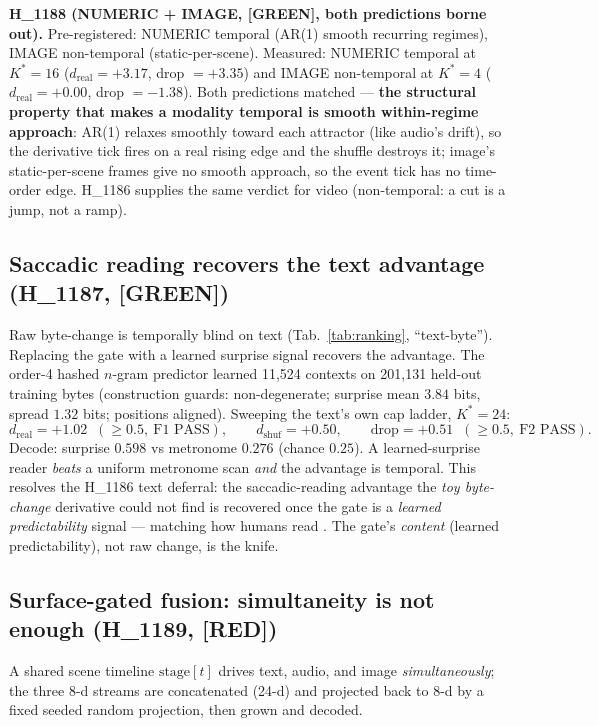 \documentclass[11pt,a4paper]{article}
\providecommand{\tierGreen}{\textbf{[GREEN]}}
\providecommand{\tierRed}{\textbf{[RED]}}
\newcommand{\dreal}{d_{\mathrm{real}}}
\newcommand{\dshuf}{d_{\mathrm{shuf}}}
\newcommand{\Kstar}{K^{\!*}}
\begin{document}
\noindent\textbf{H\_1188 (NUMERIC + IMAGE, \tierGreen, both predictions borne
out).} Pre-registered: NUMERIC temporal (AR(1) smooth recurring regimes), IMAGE
non-temporal (static-per-scene). Measured: NUMERIC temporal at $\Kstar{=}16$
($\dreal{=}{+}3.17$, drop $={+}3.35$) and IMAGE non-temporal at $\Kstar{=}4$
($\dreal{=}{+}0.00$, drop $={-}1.38$). Both predictions matched ---
\textbf{the structural property that makes a modality temporal is smooth
within-regime approach}: AR(1) relaxes smoothly toward each attractor (like audio's
drift), so the derivative tick fires on a real rising edge and the shuffle destroys
it; image's static-per-scene frames give no smooth approach, so the event tick has
no time-order edge. H\_1186 supplies the same verdict for video (non-temporal: a
cut is a jump, not a ramp).

\subsection{Saccadic reading recovers the text advantage (H\_1187, \tierGreen)}

Raw byte-change is temporally blind on text (Tab.~\ref{tab:ranking},
``text-byte''). Replacing the gate with a learned surprise signal recovers the
advantage. The order-4 hashed $n$-gram predictor learned 11{,}524 contexts on
201{,}131 held-out training bytes (construction guards: non-degenerate; surprise
mean $3.84$ bits, spread $1.32$ bits; positions aligned). Sweeping the text's own
cap ladder, $\Kstar{=}24$:
\[
\dreal = +1.02 \;\;(\geq 0.5,\ \text{F1 PASS}),\qquad
\dshuf = +0.50,\qquad
\text{drop}=+0.51 \;\;(\geq 0.5,\ \text{F2 PASS}).
\]
Decode: surprise $0.598$ vs metronome $0.276$ (chance $0.25$). A learned-surprise
reader \emph{beats} a uniform metronome scan \emph{and} the advantage is temporal.
This resolves the H\_1186 text deferral: the saccadic-reading advantage the
\emph{toy byte-change} derivative could not find is recovered once the gate is a
\emph{learned predictability} signal --- matching how humans read
\citep{hale2001probabilistic,smith2013logarithmic,rayner2009eye}. The gate's
\emph{content} (learned predictability), not raw change, is the knife.

\subsection{Surface-gated fusion: simultaneity is not enough (H\_1189, \tierRed)}

A shared scene timeline $\text{stage}[t]$ drives text, audio, and image
\emph{simultaneously}; the three 8-d streams are concatenated (24-d) and projected
back to 8-d by a fixed seeded random projection, then grown and decoded.
\end{document}
